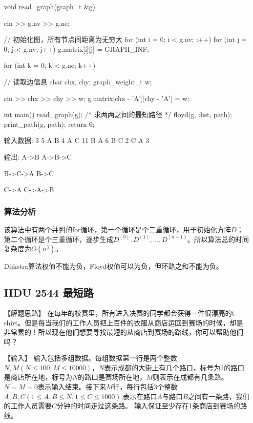 \begin{Codex}[label=am_graph_floyd.cpp]
    void read_graph(graph_t &g) {
        cin >> g.nv >> g.ne;

        // 初始化图，所有节点间距离为无穷大
        for (int i = 0; i < g.nv; i++) {
            for (int j = 0; j < g.nv; j++) {
                g.matrix[i][j] = GRAPH_INF;
            }
        }

        for (int k = 0; k < g.ne; k++) { // 读取边信息
            char chx, chy;
            graph_weight_t w;

            cin >> chx >> chy >> w;
            g.matrix[chx - 'A'][chy - 'A'] = w;
        }
    }
    int main() {
        read_graph(g);
        /* 求两两之间的最短路径 */
        floyd(g, dist, path);
        print_path(g, path);
        return 0;
    }

    输入数据:
        3 5
        A B 4
        A C 11
        B A 6
        B C 2
        C A 3

    输出:
        A->B
        A->B->C

        B->C->A
        B->C

        C->A
        C->A->B
\end{Codex}

\subsubsection{算法分析}
该算法中有两个并列的for循环，第一个循环是个二重循环，用于初始化方阵$D$；第二个循环是个三重循环，逐步生成$D^{(0)}, D^{(1)} ,...,D^{(n-1)}$。所以算法总的时间复杂度为$O(n^3)$。

Dijkstra算法权值不能为负，Floyd权值可以为负，但环路之和不能为负。


\subsection{HDU 2544 最短路}
【解题思路】
在每年的校赛里，所有进入决赛的同学都会获得一件很漂亮的t-shirt。但是每当我们的工作人员把上百件的衣服从商店运回到赛场的时候，却是非常累的！所以现在他们想要寻找最短的从商店到赛场的路线，你可以帮助他们吗？

【输入】
输入包括多组数据。每组数据第一行是两个整数$N,M(N \leq 100,M \leq 10000)$，$N$表示成都的大街上有几个路口，标号为1的路口是商店所在地，标号为$N$的路口是赛场所在地，$M$则表示在成都有几条路。$N=M=0$表示输入结束。接下来$M$行，每行包括3个整数$A,B,C(1 \leq A,B \leq N,1 \leq C \leq 1000)$,表示在路口$A$与路口$B$之间有一条路，我们的工作人员需要$C$分钟的时间走过这条路。
输入保证至少存在1条商店到赛场的路线。

